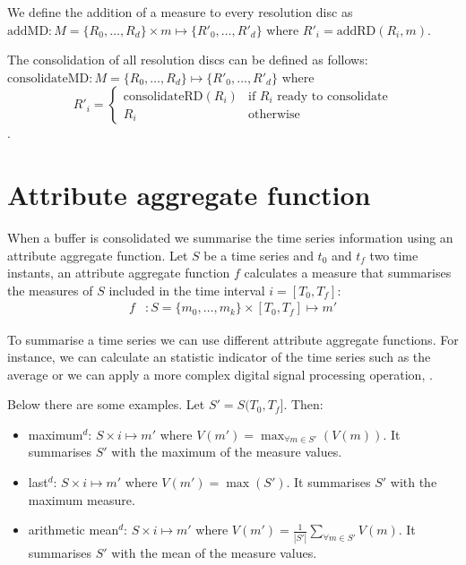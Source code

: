 We define the addition of a measure to every resolution disc as
$\text{addMD} : M=\{R_0, \dots, R_d\} \times m \mapsto \{R'_0, \dots,
R'_d\}$ where $R'_i=\text{addRD}(R_i,m)$.

The consolidation of all resolution discs can be defined as follows:
$\text{consolidateMD}: M=\{R_0, \dots, R_d\} \mapsto \{R'_0, \dots,
R'_d\}$ where
$$ 
R'_i = \begin{cases}
  \text{consolidateRD}(R_i) & \text{if } R_i \text{ ready to consolidate} \\
  R_i                       & \text{otherwise}
\end{cases}
$$.


\section{Attribute aggregate function}
\label{sec:model:interpolador}

When a buffer is consolidated we summarise the time series information
using an attribute aggregate function.  Let $S$ be a time series and
$t_0$ and $t_f$ two time instants, an attribute aggregate function $f$
calculates a measure that summarises the measures of $S$ included in
the time interval $i=[T_0,T_f]$:
\begin{align*}
f&:S=\{m_0,\ldots,m_k\} \times [T_0,T_f] \mapsto m'
\end{align*}

To summarise a time series we can use different attribute aggregate
functions.  For instance, we can calculate an statistic indicator of
the time series such as the average or we can apply a more complex
digital signal processing operation, \cite{zhang11}.

Below there are some examples. Let $S'=S(T_0,T_f]$. Then:
\begin{itemize}
\renewcommand{\labelitemi}{--}
\item maximum$^d$: $S \times i \mapsto m'$ where $V(m') =
  \max_{\forall m \in S'}(V(m))$. It summarises $S'$ with the maximum
  of the measure values.
\item last$^d$: $S \times i \mapsto m'$ where $V(m') = \max(S')$. It
  summarises $S'$ with the maximum measure.
\item arithmetic mean$^d$: $S \times i \mapsto m'$ where $V(m') =
  \frac{1}{|S'|} \sum\limits_{\forall m\in S'} V(m)$. It
  summarises $S'$ with the mean of the measure values.
\end{itemize}

